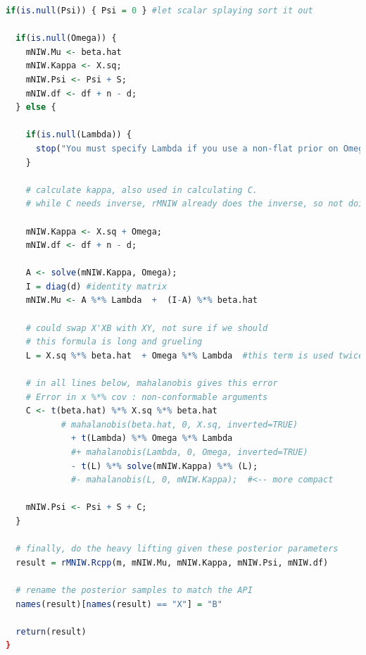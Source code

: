 \documentclass[english]{report}
\begin{document}
\begin{lstlisting}[frame=single, language=R]
  if(is.null(Psi)) { Psi = 0 } #let scalar splaying sort it out
  
  if(is.null(Omega)) {
    mNIW.Mu <- beta.hat
    mNIW.Kappa <- X.sq;
    mNIW.Psi <- Psi + S;
    mNIW.df <- df + n - d;
  } else {
    
    if(is.null(Lambda)) {
      stop("You must specify Lambda if you use a non-flat prior on Omega");
    }
    
    # calculate kappa, also used in calculating C.
    # while C needs inverse, rMNIW already does the inverse, so not doing it here
    
    mNIW.Kappa <- X.sq + Omega;
    mNIW.df <- df + n - d;
    
    A <- solve(mNIW.Kappa, Omega);    
    I = diag(d) #identity matrix
    mNIW.Mu <- A %*% Lambda  +  (I-A) %*% beta.hat
    
    # could swap X'XB with XY, not sure if we should
    # this formula is long and grueling
    L = X.sq %*% beta.hat  + Omega %*% Lambda  #this term is used twice
    
    # in all lines below, mahalanobis gives this error 
    # Error in x %*% cov : non-conformable arguments
    C <- t(beta.hat) %*% X.sq %*% beta.hat
           # mahalanobis(beta.hat, 0, X.sq, inverted=TRUE)
             + t(Lambda) %*% Omega %*% Lambda
             #+ mahalanobis(Lambda, 0, Omega, inverted=TRUE) 
             - t(L) %*% solve(mNIW.Kappa) %*% (L);
             #- mahalanobis(L, 0, mNIW.Kappa);  #<-- more compact
             
    mNIW.Psi <- Psi + S + C;
  }
  
  # finally, do the heavy lifting given these posterior parameters
  result = rMNIW.Rcpp(m, mNIW.Mu, mNIW.Kappa, mNIW.Psi, mNIW.df)
  
  # rename the posterior samples to match the API
  names(result)[names(result) == "X"] = "B" 
  
  return(result)
}

\end{lstlisting}

\newpage
\end{document}
